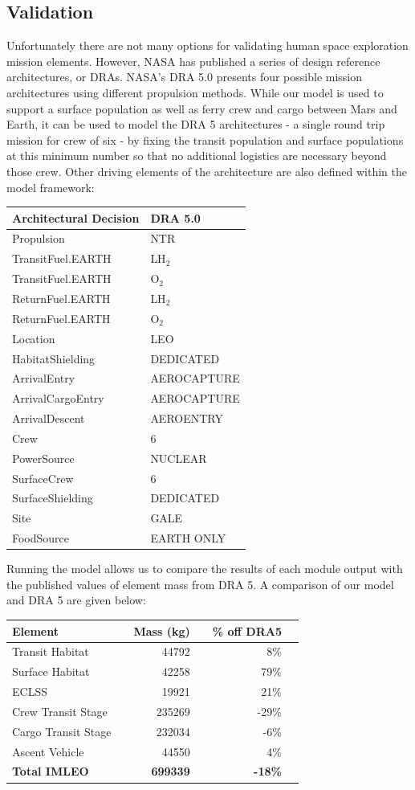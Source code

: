 \documentclass[]{aiaa-pretty}
\begin{document}
\subsection{Validation}
Unfortunately there are not many options for validating human space exploration mission elements. However, NASA has published a series of design reference architectures, or DRAs. NASA's DRA 5.0 presents four possible mission architectures using different propulsion methods. While our model is used to support a surface population as well as ferry crew and cargo between Mars and Earth, it can be used to model the DRA 5 architectures - a single round trip mission for crew of six - by fixing the transit population and surface populations at this minimum number so that no additional logistics are necessary beyond those crew. Other driving elements of the architecture are also defined within the model framework: 
\begin{center}
	\begin{tabular}{ll}
		\textbf{Architectural Decision} & \textbf{DRA 5.0} \\ \hline
		Propulsion & NTR \\
		TransitFuel.EARTH & LH$_2$\\
		TransitFuel.EARTH & O$_2$\\
		ReturnFuel.EARTH & LH$_2$\\
		ReturnFuel.EARTH & O$_2$\\
		Location & LEO\\
		HabitatShielding & DEDICATED\\
		ArrivalEntry & AEROCAPTURE\\
		ArrivalCargoEntry & AEROCAPTURE\\
		ArrivalDescent & AEROENTRY\\
		Crew & 6\\
		PowerSource & NUCLEAR\\
		SurfaceCrew & 6\\
		SurfaceShielding & DEDICATED\\
		Site & GALE\\
		FoodSource & EARTH ONLY\\
	\end{tabular}
\end{center}
Running the model allows us to compare the results of each module output with the published values of element mass from DRA 5. A comparison of our model and DRA 5 are given below:
\begin{center}
	\begin{tabular}{ lc rc rc}
		\textbf{Element} && \textbf{Mass (kg)} && \textbf{\% off DRA5} \\\hline
		Transit Habitat && 44792 && 8\% \\
		Surface Habitat && 42258 && 79\% \\
		ECLSS && 19921 && 21\% \\
		Crew Transit Stage && 235269 && -29\% \\
		Cargo Transit Stage && 232034 && -6\% \\
		Ascent Vehicle && 44550 && 4\% \\
		\textbf{Total IMLEO} && \textbf{699339} && \textbf{-18\%} \\
	\end{tabular}
\end{center}
\end{document}

